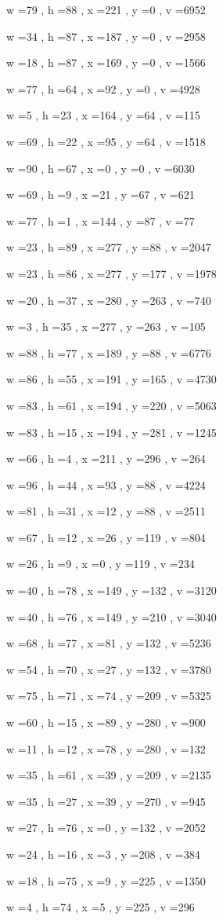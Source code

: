\documentclass[11pt]{article}
\begin{document}
w =79 , h =88 , x =221 , y =0 , v =6952
\par
w =34 , h =87 , x =187 , y =0 , v =2958
\par
w =18 , h =87 , x =169 , y =0 , v =1566
\par
w =77 , h =64 , x =92 , y =0 , v =4928
\par
w =5 , h =23 , x =164 , y =64 , v =115
\par
w =69 , h =22 , x =95 , y =64 , v =1518
\par
w =90 , h =67 , x =0 , y =0 , v =6030
\par
w =69 , h =9 , x =21 , y =67 , v =621
\par
w =77 , h =1 , x =144 , y =87 , v =77
\par
w =23 , h =89 , x =277 , y =88 , v =2047
\par
w =23 , h =86 , x =277 , y =177 , v =1978
\par
w =20 , h =37 , x =280 , y =263 , v =740
\par
w =3 , h =35 , x =277 , y =263 , v =105
\par
w =88 , h =77 , x =189 , y =88 , v =6776
\par
w =86 , h =55 , x =191 , y =165 , v =4730
\par
w =83 , h =61 , x =194 , y =220 , v =5063
\par
w =83 , h =15 , x =194 , y =281 , v =1245
\par
w =66 , h =4 , x =211 , y =296 , v =264
\par
w =96 , h =44 , x =93 , y =88 , v =4224
\par
w =81 , h =31 , x =12 , y =88 , v =2511
\par
w =67 , h =12 , x =26 , y =119 , v =804
\par
w =26 , h =9 , x =0 , y =119 , v =234
\par
w =40 , h =78 , x =149 , y =132 , v =3120
\par
w =40 , h =76 , x =149 , y =210 , v =3040
\par
w =68 , h =77 , x =81 , y =132 , v =5236
\par
w =54 , h =70 , x =27 , y =132 , v =3780
\par
w =75 , h =71 , x =74 , y =209 , v =5325
\par
w =60 , h =15 , x =89 , y =280 , v =900
\par
w =11 , h =12 , x =78 , y =280 , v =132
\par
w =35 , h =61 , x =39 , y =209 , v =2135
\par
w =35 , h =27 , x =39 , y =270 , v =945
\par
w =27 , h =76 , x =0 , y =132 , v =2052
\par
w =24 , h =16 , x =3 , y =208 , v =384
\par
w =18 , h =75 , x =9 , y =225 , v =1350
\par
w =4 , h =74 , x =5 , y =225 , v =296
\par
\newpage
\end{document}
